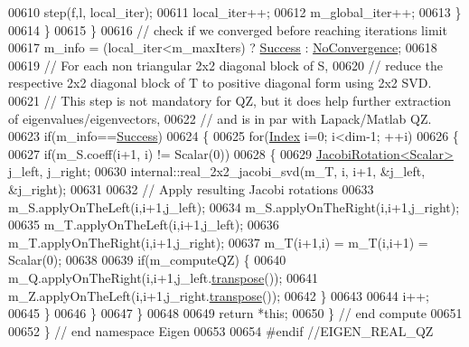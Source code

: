 \begin{DoxyCode}
00610             step(f,l, local\_iter);
00611             local\_iter++;
00612             m\_global\_iter++;
00613           \}
00614         \}
00615       \}
00616       \textcolor{comment}{// check if we converged before reaching iterations limit}
00617       m\_info = (local\_iter<m\_maxIters) ? \hyperlink{group__enums_gga85fad7b87587764e5cf6b513a9e0ee5ea52581b035f4b59c203b8ff999ef5fcea}{Success} : \hyperlink{group__enums_gga85fad7b87587764e5cf6b513a9e0ee5eaba1c8763d1179778070f365ecc4157a8}{NoConvergence};
00618 
00619       \textcolor{comment}{// For each non triangular 2x2 diagonal block of S,}
00620       \textcolor{comment}{//    reduce the respective 2x2 diagonal block of T to positive diagonal form using 2x2 SVD.}
00621       \textcolor{comment}{// This step is not mandatory for QZ, but it does help further extraction of
       eigenvalues/eigenvectors,}
00622       \textcolor{comment}{// and is in par with Lapack/Matlab QZ.}
00623       \textcolor{keywordflow}{if}(m\_info==\hyperlink{group__enums_gga85fad7b87587764e5cf6b513a9e0ee5ea52581b035f4b59c203b8ff999ef5fcea}{Success})
00624       \{
00625         \textcolor{keywordflow}{for}(\hyperlink{group___eigenvalues___module_a6201e534e901b5f4e66f72c176b534a3}{Index} i=0; i<dim-1; ++i)
00626         \{
00627           \textcolor{keywordflow}{if}(m\_S.coeff(i+1, i) != Scalar(0))
00628           \{
00629             \hyperlink{group___jacobi___module_class_eigen_1_1_jacobi_rotation}{JacobiRotation<Scalar>} j\_left, j\_right;
00630             internal::real\_2x2\_jacobi\_svd(m\_T, i, i+1, &j\_left, &j\_right);
00631 
00632             \textcolor{comment}{// Apply resulting Jacobi rotations}
00633             m\_S.applyOnTheLeft(i,i+1,j\_left);
00634             m\_S.applyOnTheRight(i,i+1,j\_right);
00635             m\_T.applyOnTheLeft(i,i+1,j\_left);
00636             m\_T.applyOnTheRight(i,i+1,j\_right);
00637             m\_T(i+1,i) = m\_T(i,i+1) = Scalar(0);
00638 
00639             \textcolor{keywordflow}{if}(m\_computeQZ) \{
00640               m\_Q.applyOnTheRight(i,i+1,j\_left.\hyperlink{group___jacobi___module_ab40e9cdc4582593511e57ee896e055a2}{transpose}());
00641               m\_Z.applyOnTheLeft(i,i+1,j\_right.\hyperlink{group___jacobi___module_ab40e9cdc4582593511e57ee896e055a2}{transpose}());
00642             \}
00643 
00644             i++;
00645           \}
00646         \}
00647       \}
00648 
00649       \textcolor{keywordflow}{return} *\textcolor{keyword}{this};
00650     \} \textcolor{comment}{// end compute}
00651 
00652 \} \textcolor{comment}{// end namespace Eigen}
00653 
00654 \textcolor{preprocessor}{#endif //EIGEN\_REAL\_QZ}
\end{DoxyCode}
